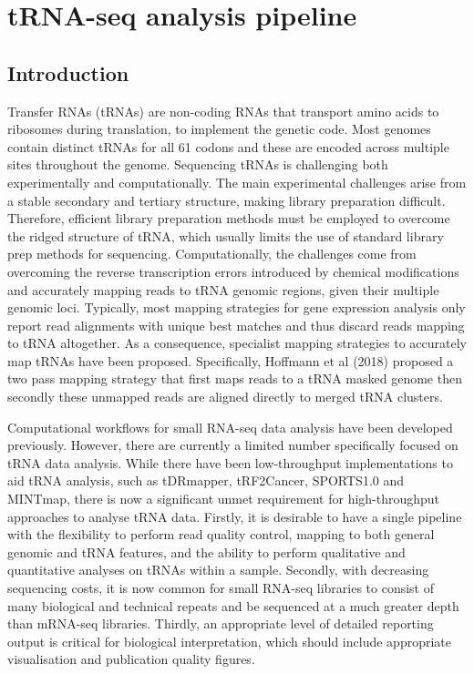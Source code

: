 \section{tRNA-seq analysis pipeline}\label{sec:trna_methods}

\subsection{Introduction}
Transfer RNAs (tRNAs) are non-coding RNAs that transport amino acids to ribosomes during translation, to implement the genetic code.
Most genomes contain distinct tRNAs for all 61 codons and these are encoded across multiple sites throughout the genome.
Sequencing tRNAs is challenging both experimentally and computationally.
The main experimental challenges arise from a stable secondary and tertiary structure, making library preparation difficult\cite{kim1973three}.
Therefore, efficient library preparation methods must be employed to overcome the ridged structure of tRNA, which usually limits the use of standard library prep methods for sequencing\cite{shigematsu2017yamat}.
Computationally, the challenges come from overcoming the reverse transcription errors introduced by chemical modifications and accurately mapping reads to tRNA genomic regions, given their multiple genomic loci\cite{hoffmann2018accurate}.
Typically, most mapping strategies for gene expression analysis only report read alignments with unique best matches and thus discard reads mapping to tRNA altogether.
As a consequence, specialist mapping strategies to accurately map tRNAs have been proposed\cite{selitsky2015tdrmapper, loher2017mintmap, gebert2017unitas}.
Specifically, Hoffmann et al (2018) proposed a two pass mapping strategy that first maps reads to a tRNA masked genome then secondly these unmapped reads are aligned directly to merged tRNA clusters\cite{hoffmann2018accurate}.

Computational workflows for small RNA-seq data analysis have been developed previously\cite{wu2017srnanalyzer}.
However, there are currently a limited number specifically focused on tRNA data analysis.
While there have been low-throughput implementations to aid tRNA analysis, such as tDRmapper\cite{selitsky2015tdrmapper}, tRF2Cancer\cite{zheng2016trf2cancer}, SPORTS1.0\cite{shi2018sports1} and MINTmap\cite{loher2017mintmap}, there is now a significant unmet requirement for high-throughput approaches to analyse tRNA data.
Firstly, it is desirable to have a single pipeline with the flexibility to perform read quality control, mapping to both general genomic and tRNA features, and the ability to perform qualitative and quantitative analyses on tRNAs within a sample.
Secondly, with decreasing sequencing costs, it is now common for small RNA-seq libraries to consist of many biological and technical repeats and be sequenced at a much greater depth than mRNA-seq libraries.
Thirdly, an appropriate level of detailed reporting output is critical for biological interpretation, which should include appropriate visualisation and publication quality figures.

